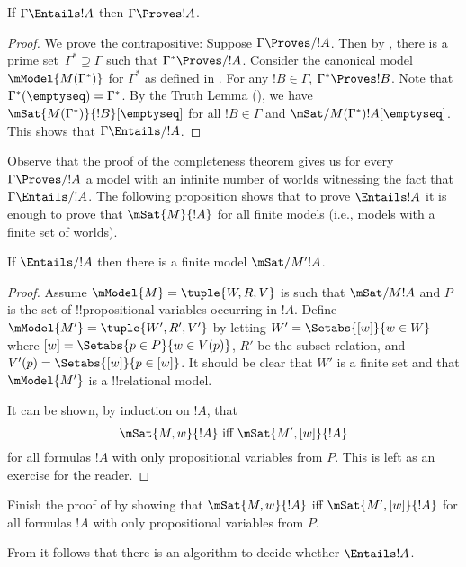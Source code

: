 \documentclass[../../../include/open-logic-section]{subfiles}
\begin{document}


\begin{thm}
  If $\Gamma \Entails !A$ then $\Gamma \Proves !A$.
\end{thm}

\begin{proof}
  We prove the contrapositive: Suppose $\Gamma \Proves/ !A$. Then by
  , there is a prime set~$\Gamma^*
  \supseteq \Gamma$ such that $\Gamma^* \Proves/ !A$. Consider the
  canonical model~$\mModel{M(\Gamma^*)}$ for $\Gamma^*$ as defined in
  . For any $!B \in \Gamma$, $\Gamma^*
  \Proves !B$. Note that $\Gamma^*(\emptyseq) = \Gamma^*$. By the Truth
  Lemma (), we have
  $\mSat{M(\Gamma^*)}{!B}[\emptyseq]$ for all $!B \in \Gamma$ and
  $\mSat/{M(\Gamma^*)}{!A}[\emptyseq]$. This shows that $\Gamma
  \Entails/ !A$.
\end{proof}

Observe that the proof of the completeness theorem gives us for 
every $\Gamma \Proves/ !A$ a model with an infinite number of worlds 
witnessing the fact that $\Gamma \Entails/ !A$. The following proposition shows 
that to prove $\Entails !A$ it is enough to prove that $\mSat{M}{!A}$ 
for all finite models (i.e., models with a finite set of worlds).

\begin{thm}
  If $\Entails/ !A$ then there is a finite model $\mSat/{M'}{!A}$.
\end{thm}
\begin{proof}
  Assume $\mModel{M}=\tuple{W, R, V}$ is such that $\mSat/{M}{!A}$ and $P$ 
  is the set of !!{propositional variable}s occurring in $!A$. Define
  $\mModel{M'}=\tuple{W', R', V'}$ by letting $W' = \Setabs{[w]}{w \in W}$ 
  where $[w] = \Setabs{p \in P}{w \in V(p)}$, $R'$ be the subset relation, 
  and $V'(p)=\Setabs{[w]}{p \in [w]}$. It should be clear that $W'$ is a 
  finite set and that $\mModel{M'}$ is a !!{relational model}.

  It can be shown, by induction on $!A$, that 
  $$ \mSat{M,w}{!A} \text{ iff } \mSat{M',[w]}{!A}$$
  for all formulas $!A$ with only propositional variables from $P$. This is left as an exercise for the reader.
\end{proof}

\begin{prob}
Finish the proof of  by showing that $\mSat{M,w}{!A}$ iff 
$\mSat{M',[w]}{!A}$ for all formulas $!A$ with only propositional variables from $P$. 
\end{prob}

From  it follows that there is an algorithm to decide whether $\Entails !A$.
\end{document}
